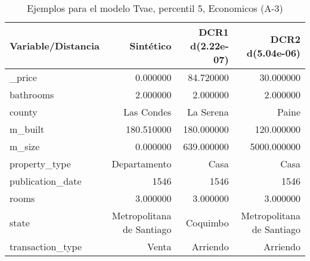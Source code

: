 \begin{table}[H]
\centering
\fontsize{10}{14}\selectfont
\caption{Ejemplos para el modelo Tvae, percentil 5, Economicos (A-3)}
\label{table-example-economicos-a-3-tvae-5p}
\begin{tabular}{|l|r|r|r|}
\hline
\rowcolor[gray]{0.8}
Variable/Distancia & Sintético & DCR1 d(2.22e-07) & DCR2 d(5.04e-06) \\
\hline \_price & \cellcolor[rgb]{0.9, 0.54, 0.52} 0.000000 & 84.720000 & 30.000000 \\
\hline bathrooms & \cellcolor[rgb]{0.9, 0.54, 0.52} 2.000000 & \cellcolor[rgb]{0.9, 0.54, 0.52} 2.000000 & \cellcolor[rgb]{0.9, 0.54, 0.52} 2.000000 \\
\hline county & \cellcolor[rgb]{0.9, 0.54, 0.52} Las Condes & La Serena & Paine \\
\hline m\_built & \cellcolor[rgb]{0.9, 0.54, 0.52} 180.510000 & 180.000000 & 120.000000 \\
\hline m\_size & \cellcolor[rgb]{0.9, 0.54, 0.52} 0.000000 & 639.000000 & 5000.000000 \\
\hline property\_type & \cellcolor[rgb]{0.9, 0.54, 0.52} Departamento & Casa & Casa \\
\hline publication\_date & \cellcolor[rgb]{0.9, 0.54, 0.52} 1546 & \cellcolor[rgb]{0.9, 0.54, 0.52} 1546 & \cellcolor[rgb]{0.9, 0.54, 0.52} 1546 \\
\hline rooms & \cellcolor[rgb]{0.9, 0.54, 0.52} 3.000000 & \cellcolor[rgb]{0.9, 0.54, 0.52} 3.000000 & \cellcolor[rgb]{0.9, 0.54, 0.52} 3.000000 \\
\hline state & \cellcolor[rgb]{0.9, 0.54, 0.52} Metropolitana de Santiago & Coquimbo & \cellcolor[rgb]{0.9, 0.54, 0.52} Metropolitana de Santiago \\
\hline transaction\_type & \cellcolor[rgb]{0.9, 0.54, 0.52} Venta & Arriendo & Arriendo \\
\hline
\end{tabular}
\end{table}
